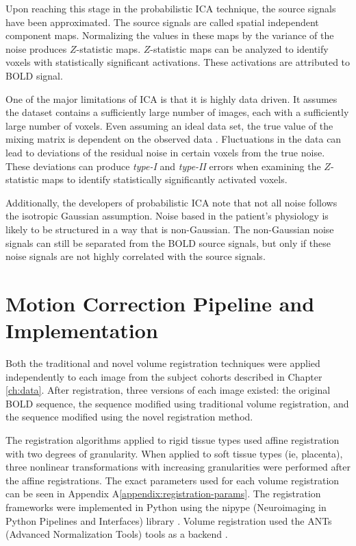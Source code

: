 Upon reaching this stage in the probabilistic ICA technique, the source signals have been approximated. The source signals are called spatial independent component maps. Normalizing the values in these maps by the variance of the noise produces $Z$-statistic maps. $Z$-statistic maps can be analyzed to identify voxels with statistically significant activations. These activations are attributed to BOLD signal.

One of the major limitations of ICA is that it is highly data driven. It assumes the dataset contains a sufficiently large number of images, each with a sufficiently large number of voxels. Even assuming an ideal data set, the true value of the mixing matrix is dependent on the observed data \cite{Beckmann2004}. Fluctuations in the data can lead to deviations of the residual noise in certain voxels from the true noise. These deviations can produce \textit{type-I} and \textit{type-II} errors when examining the $Z$-statistic maps to identify statistically significantly activated voxels.
 
Additionally, the developers of probabilistic ICA note that not all noise follows the isotropic Gaussian assumption. Noise based in the patient's physiology is likely to be structured in a way that is non-Gaussian. The non-Gaussian noise signals can still be separated from the BOLD source signals, but only if these noise signals are not highly correlated with the source signals.

\section{Motion Correction Pipeline and Implementation}

Both the traditional and novel volume registration techniques were applied independently to each image from the subject cohorts described in Chapter \ref{ch:data}. After registration, three versions of each image existed: the original BOLD sequence, the sequence modified using traditional volume registration, and the sequence modified using the novel registration method.

The registration algorithms applied to rigid tissue types used affine registration with two degrees of granularity. When applied to soft tissue types (ie, placenta),  three nonlinear transformations with increasing granularities were performed after the affine registrations. The exact parameters used for each volume registration can be seen in Appendix A\ref{appendix:registration-params}. The registration frameworks were implemented in Python using the nipype (Neuroimaging in Python Pipelines and Interfaces) library \cite{Gorgolewski2011}. Volume registration used the ANTs (Advanced Normalization Tools) tools as a backend \cite{Avants2014}.


